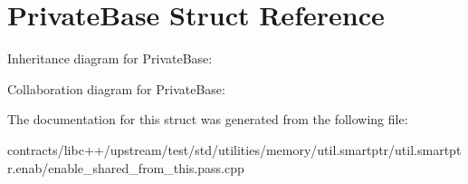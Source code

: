 \hypertarget{struct_private_base}{}\section{Private\+Base Struct Reference}
\label{struct_private_base}


Inheritance diagram for Private\+Base\+:


Collaboration diagram for Private\+Base\+:


The documentation for this struct was generated from the following file\+:\begin{DoxyCompactItemize}
\item 
contracts/libc++/upstream/test/std/utilities/memory/util.\+smartptr/util.\+smartptr.\+enab/enable\+\_\+shared\+\_\+from\+\_\+this.\+pass.\+cpp\end{DoxyCompactItemize}
